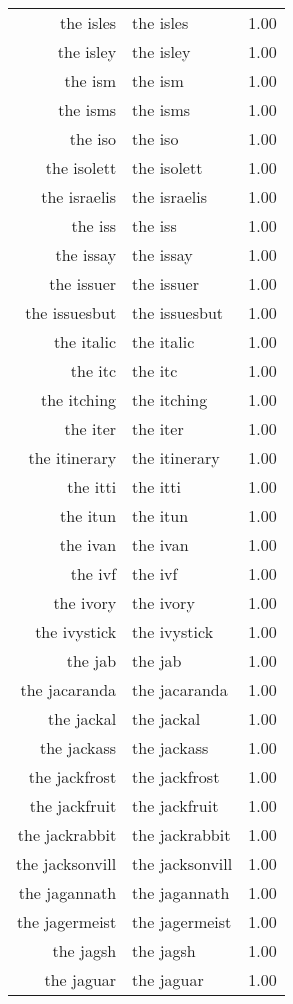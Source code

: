 \begin{table}[ht]
\begin{tabular}{rlr}
  the isles & the isles & 1.00 \\ 
  the isley & the isley & 1.00 \\ 
  the ism & the ism & 1.00 \\ 
  the isms & the isms & 1.00 \\ 
  the iso & the iso & 1.00 \\ 
  the isolett & the isolett & 1.00 \\ 
  the israelis & the israelis & 1.00 \\ 
  the iss & the iss & 1.00 \\ 
  the issay & the issay & 1.00 \\ 
  the issuer & the issuer & 1.00 \\ 
  the issuesbut & the issuesbut & 1.00 \\ 
  the italic & the italic & 1.00 \\ 
  the itc & the itc & 1.00 \\ 
  the itching & the itching & 1.00 \\ 
  the iter & the iter & 1.00 \\ 
  the itinerary & the itinerary & 1.00 \\ 
  the itti & the itti & 1.00 \\ 
  the itun & the itun & 1.00 \\ 
  the ivan & the ivan & 1.00 \\ 
  the ivf & the ivf & 1.00 \\ 
  the ivory & the ivory & 1.00 \\ 
  the ivystick & the ivystick & 1.00 \\ 
  the jab & the jab & 1.00 \\ 
  the jacaranda & the jacaranda & 1.00 \\ 
  the jackal & the jackal & 1.00 \\ 
  the jackass & the jackass & 1.00 \\ 
  the jackfrost & the jackfrost & 1.00 \\ 
  the jackfruit & the jackfruit & 1.00 \\ 
  the jackrabbit & the jackrabbit & 1.00 \\ 
  the jacksonvill & the jacksonvill & 1.00 \\ 
  the jagannath & the jagannath & 1.00 \\ 
  the jagermeist & the jagermeist & 1.00 \\ 
  the jagsh & the jagsh & 1.00 \\ 
  the jaguar & the jaguar & 1.00 \\ 

\end{tabular}
\end{table}
